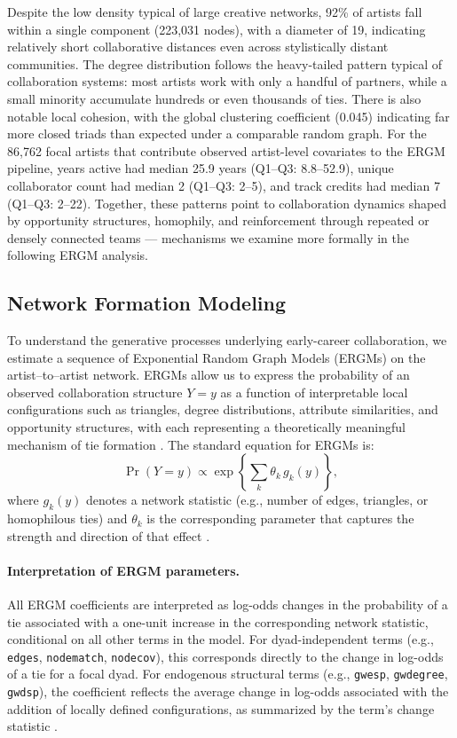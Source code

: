 \documentclass[fleqn,10pt]{wlscirep}
\begin{document}
Despite the low density typical of large creative networks, 92\% of artists fall within a single component (223,031 nodes), with a diameter of 19, indicating relatively short collaborative distances even across stylistically distant communities. The degree distribution follows the heavy-tailed pattern typical of collaboration systems: most artists work with only a handful of partners, while a small minority accumulate hundreds or even thousands of ties. There is also notable local cohesion, with the global clustering coefficient (0.045) indicating far more closed triads than expected under a comparable random graph. For the 86,762 focal artists that contribute observed artist-level covariates to the ERGM pipeline, years active had median 25.9 years (Q1--Q3: 8.8--52.9), unique collaborator count had median 2 (Q1--Q3: 2--5), and track credits had median 7 (Q1--Q3: 2--22). Together, these patterns point to collaboration dynamics shaped by opportunity structures, homophily, and reinforcement through repeated or densely connected teams --- mechanisms we examine more formally in the following ERGM analysis.

\subsection*{Network Formation Modeling}
To understand the generative processes underlying early-career collaboration, we estimate a sequence of Exponential Random Graph Models (ERGMs) on the artist--to--artist network. ERGMs allow us to express the probability of an observed collaboration structure $Y = y$ as a function of interpretable local configurations such as triangles, degree distributions, attribute similarities, and opportunity structures, with each representing a theoretically meaningful mechanism of tie formation \cite{Robins2007IntroERGM}. The standard equation for ERGMs is:
\begin{equation}
\Pr(Y = y) \propto 
\exp\left\{
    \sum_{k} \theta_k \, g_k(y)
\right\},
\label{eq:ergm-general-intext}
\end{equation}
where $g_k(y)$ denotes a network statistic (e.g., number of edges, triangles, or homophilous ties) and $\theta_k$ is the corresponding parameter that captures the strength and direction of that effect \cite{Robins2007IntroERGM}.

\paragraph*{Interpretation of ERGM parameters.}
All ERGM coefficients are interpreted as log-odds changes in the probability of a tie associated with a one-unit increase in the corresponding network statistic, conditional on all other terms in the model. For dyad-independent terms (e.g., \texttt{edges}, \texttt{nodematch}, \texttt{nodecov}), this corresponds directly to the change in log-odds of a tie for a focal dyad. For endogenous structural terms (e.g., \texttt{gwesp}, \texttt{gwdegree}, \texttt{gwdsp}), the coefficient reflects the average change in log-odds associated with the addition of locally defined configurations, as summarized by the term’s change statistic \cite{Robins2007IntroERGM}.
\end{document}
